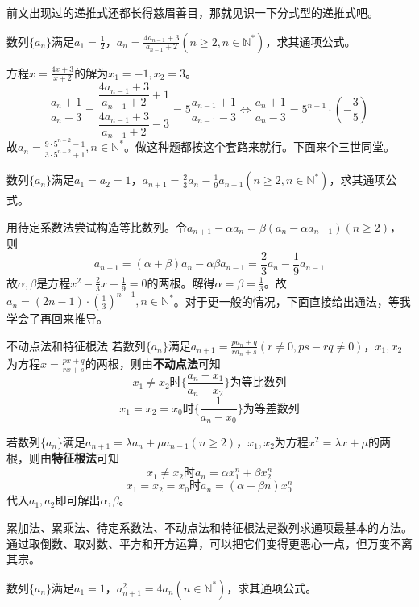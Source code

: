 \documentclass[../sample]{subfiles}
\begin{document}
前文出现过的递推式还都长得慈眉善目，那就见识一下分式型的递推式吧。

\begin{problem}
  数列$\{a_n\}$满足$a_1=\frac{1}{2}$，$a_n=\frac{4a_{n-1}+3}{a_{n-1}+2}(n\geq 2,n\in\mathbb{N^*})$，求其通项公式。
\end{problem}

方程$x=\frac{4x+3}{x+2}$的解为$x_1=-1, x_2=3$。
\[\frac{a_n+1}{a_n-3}=\frac{\dfrac{4a_{n-1}+3}{a_{n-1}+2}+1}{\dfrac{4a_{n-1}+3}{a_{n-1}+2}-3}=5\frac{a_{n-1}+1}{a_{n-1}-3}\Leftrightarrow \frac{a_n+1}{a_n-3}=5^{n-1}·(-\frac{3}{5})\]
故$a_n=\frac{9·5^{n-2}-1}{3·5^{n-2}+1},n\in\mathbb{N^*}$。做这种题都按这个套路来就行。下面来个三世同堂。

\begin{problem}
  数列$\{a_n\}$满足$a_1=a_2=1$，$a_{n+1}=\frac{2}{3}a_n-\frac{1}{9}a_{n-1}(n\geq 2,n\in\mathbb{N^*})$，求其通项公式。
\end{problem}

用待定系数法尝试构造等比数列。令$a_{n+1}-\alpha a_n=\beta (a_n-\alpha a_{n-1})(n\geq 2)$，则\[a_{n+1}=(\alpha+\beta)a_n-\alpha\beta a_{n-1}=\frac{2}{3}a_n-\frac{1}{9}a_{n-1}\]
故$\alpha, \beta$是方程$x^2-\frac{2}{3}x+\frac{1}{9}=0$的两根。解得$\alpha=\beta=\frac{1}{3}$。故$a_n=(2n-1)·(\frac{1}{3})^{n-1},n\in\mathbb{N^*}$。对于更一般的情况，下面直接给出通法，等我学会了再回来推导。

\begin{theorem}{不动点法和特征根法}
  若数列$\{a_n\}$满足$a_{n+1}=\frac{pa_n+q}{ra_n+s}(r\neq 0, ps-rq\neq 0)$，$x_1, x_2$为方程$x=\frac{px+q}{rx+s}$的两根，则由\textbf{不动点法}可知
  \[x_1\neq x_2时\{\frac{a_n-x_1}{a_n-x_2}\}为等比数列\]
  \[x_1=x_2=x_0时\{\frac{1}{a_n-x_0}\}为等差数列\]

  若数列$\{a_n\}$满足$a_{n+1}=\lambda a_n+\mu a_{n-1}(n\geq 2)$，$x_1, x_2$为方程$x^2=\lambda x+\mu$的两根，则由\textbf{特征根法}可知
  \[x_1\neq x_2时a_n=\alpha x_1^{n}+\beta x_2^{n}\]
  \[x_1=x_2=x_0时a_n=(\alpha+\beta n)x_0^{n}\]
  代入$a_1, a_2$即可解出$\alpha, \beta$。
\end{theorem}

累加法、累乘法、待定系数法、不动点法和特征根法是数列求通项最基本的方法。通过取倒数、取对数、平方和开方运算，可以把它们变得更恶心一点，但万变不离其宗。

\begin{problem}
  数列$\{a_n\}$满足$a_1=1$，$a_{n+1}^2=4a_n(n\in\mathbb{N^*})$，求其通项公式。
\end{problem}
\end{document}
